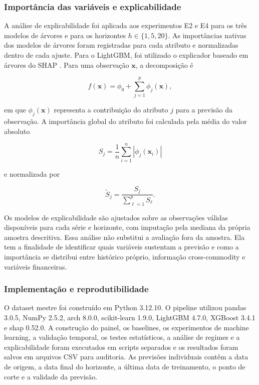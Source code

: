 \documentclass[a4paper,fleqn]{cas-sc}
\begin{document}
\subsubsection{Importância das variáveis e explicabilidade}
\label{subsec:explainability}

A análise de explicabilidade foi aplicada aos experimentos E2 e E4 para os três modelos de árvores e para os horizontes \(h\in\{1,5,20\}\). As importâncias nativas dos modelos de árvores foram registradas para cada atributo e normalizadas dentro de cada ajuste. Para o LightGBM, foi utilizado o explicador baseado em árvores do SHAP \citep{LundbergLee2017SHAP}. Para uma observação \(\mathbf{x}\), a decomposição é

\begin{equation}
f(\mathbf{x})
=
\phi_{0}
+\sum_{j=1}^{p}\phi_{j}(\mathbf{x}),
\label{eq:shap_decomposition}
\end{equation}

em que \(\phi_j(\mathbf{x})\) representa a contribuição do atributo \(j\) para a previsão da observação. A importância global do atributo foi calculada pela média do valor absoluto

\begin{equation}
S_j
=
\frac{1}{n}\sum_{i=1}^{n}
\left\lvert\phi_j(\mathbf{x}_i)\right\rvert
\label{eq:shap_global}
\end{equation}

e normalizada por

\begin{equation}
\widetilde{S}_j
=
\frac{S_j}{\sum_{\ell=1}^{p}S_{\ell}}.
\label{eq:shap_normalized}
\end{equation}

Os modelos de explicabilidade são ajustados sobre as observações válidas disponíveis para cada série e horizonte, com imputação pela mediana da própria amostra descritiva. Essa análise não substitui a avaliação fora da amostra. Ela tem a finalidade de identificar quais variáveis sustentam a previsão e como a importância se distribui entre histórico próprio, informação cross-commodity e variáveis financeiras.

\subsubsection{Implementação e reprodutibilidade}
\label{subsec:reproducibility}

O dataset mestre foi construído em Python 3.12.10. O pipeline utilizou pandas 3.0.5, NumPy 2.5.2, arch 8.0.0, scikit-learn 1.9.0, LightGBM 4.7.0, XGBoost 3.4.1 e shap 0.52.0. A construção do painel, os baselines, os experimentos de machine learning, a validação temporal, os testes estatísticos, a análise de regimes e a explicabilidade foram executados em scripts separados e os resultados foram salvos em arquivos CSV para auditoria. As previsões individuais contêm a data de origem, a data final do horizonte, a última data de treinamento, o ponto de corte e a validade da previsão.
\end{document}
